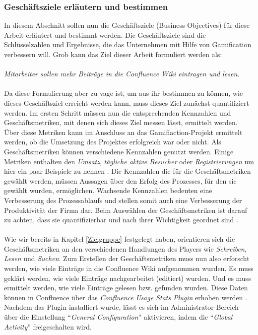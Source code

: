 \documentclass[a4paper,12pt,twoside]{scrartcl}
\begin{document}
\subsubsection{Geschäftsziele erläutern und bestimmen}
\label{Geschäftsziele}
In diesem Abschnitt sollen nun die Geschäftsziele (Business Objectives) für diese Arbeit erläutert und bestimmt werden. Die Geschäftsziele sind die Schlüsselzahlen und Ergebnisse, die das Unternehmen mit Hilfe von Gamification verbessern will. Grob kann das Ziel dieser Arbeit formuliert werden als:
\\\\
\textit{Mitarbeiter sollen mehr Beiträge in die Confluence Wiki eintragen und lesen.}
\\\\
Da diese Formulierung aber zu vage ist, um aus ihr bestimmen zu können, wie dieses Geschäftsziel erreicht werden kann, muss dieses Ziel zunächst quantifiziert werden. Im ersten Schritt müssen nun die entsprechenden Kennzahlen und Geschäftsmetriken, mit denen sich dieses Ziel messen lässt, ermittelt werden. Über diese Metriken kann im Anschluss an das Gamifiaction-Projekt ermittelt werden, ob die Umsetzung des Projektes erfolgreich war oder nicht. Als Geschäftsmetriken können verschiedene Kennzahlen genutzt werden. Einige Metriken enthalten den \textit{Umsatz}, \textit{tägliche aktive Besucher} oder \textit{Registrierungen} um hier ein paar Beispiele zu nennen \cite{Dashboard}. Die Kennzahlen die für die Geschäftsmetriken gewählt werden, müssen Aussagen über den Erfolg des Prozesses, für den sie gewählt wurden, ermöglichen. Wachsende Kennzahlen bedeuten eine Verbesserung des Prozessablaufs und stellen somit auch eine Verbesserung der Produktivität der Firma dar. Beim Auswählen der Geschäftsmetriken ist darauf zu achten, dass sie quantifizierbar und nach ihrer Wichtigkeit geordnet sind \cite{Dashboard}.
\\\\
Wie wir bereits in Kapitel \ref{Zielgruppe} festgelegt haben, orientieren sich die Geschäftsmetriken an den verschiedenen Handlungen des Players wie \textit{Schreiben}, \textit{Lesen} und \textit{Suchen}. Zum Erstellen der Geschäftsmetriken muss nun also erforscht werden, wie viele Einträge in die Confluence Wiki aufgenommen wurden. Es muss geklärt werden, wie viele Einträge nachgearbeitet (editiert) wurden. Und es muss ermittelt werden, wie viele Einträge gelesen bzw. gefunden wurden. Diese Daten können in Confluence über das \textit{Confluence Usage Stats Plugin} erhoben werden \cite{Plugin}. Nachdem das Plugin installiert wurde, lässt es sich im Administrator-Bereich über die Einstellung \enquote{\textit{General Configuration}} aktivieren, indem die \enquote{\textit{Global Activity}} freigeschalten wird.
\end{document}
